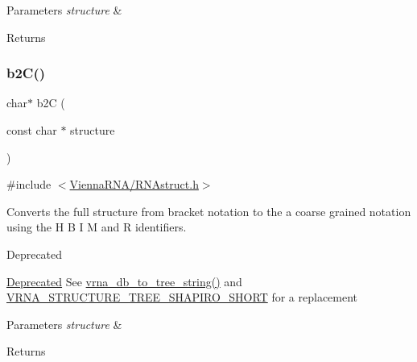\begin{DoxyParams}{Parameters}
{\em structure} & \\
\hline
\end{DoxyParams}
\begin{DoxyReturn}{Returns}

\end{DoxyReturn}
\mbox{\label{group__struct__utils__deprecated_ga9c80d92391f2833549a8b6dac92233f0}} 
\subsubsection{\texorpdfstring{b2C()}{b2C()}}
{\footnotesize\ttfamily char$\ast$ b2C (\begin{DoxyParamCaption}\item[{const char $\ast$}]{structure }\end{DoxyParamCaption})}



{\ttfamily \#include $<$\mbox{\hyperlink{RNAstruct_8h}{Vienna\+R\+N\+A/\+R\+N\+Astruct.\+h}}$>$}



Converts the full structure from bracket notation to the a coarse grained notation using the \textquotesingle{}H\textquotesingle{} \textquotesingle{}B\textquotesingle{} \textquotesingle{}I\textquotesingle{} \textquotesingle{}M\textquotesingle{} and \textquotesingle{}R\textquotesingle{} identifiers. 

\begin{DoxyRefDesc}{Deprecated}
\item[\mbox{\hyperlink{deprecated__deprecated000129}{Deprecated}}]See \mbox{\hyperlink{group__struct__utils__tree_ga56551ab7da64933a7230d29430f40cfe}{vrna\+\_\+db\+\_\+to\+\_\+tree\+\_\+string()}} and \mbox{\hyperlink{group__struct__utils__tree_ga549e259a963d77e2d5b7e14083fc016e}{V\+R\+N\+A\+\_\+\+S\+T\+R\+U\+C\+T\+U\+R\+E\+\_\+\+T\+R\+E\+E\+\_\+\+S\+H\+A\+P\+I\+R\+O\+\_\+\+S\+H\+O\+RT}} for a replacement\end{DoxyRefDesc}



\begin{DoxyParams}{Parameters}
{\em structure} & \\
\hline
\end{DoxyParams}
\begin{DoxyReturn}{Returns}

\end{DoxyReturn}
\mbox{\label{group__struct__utils__deprecated_ga5cd2feb367feeacad0c03cb7ddba5f10}} 
